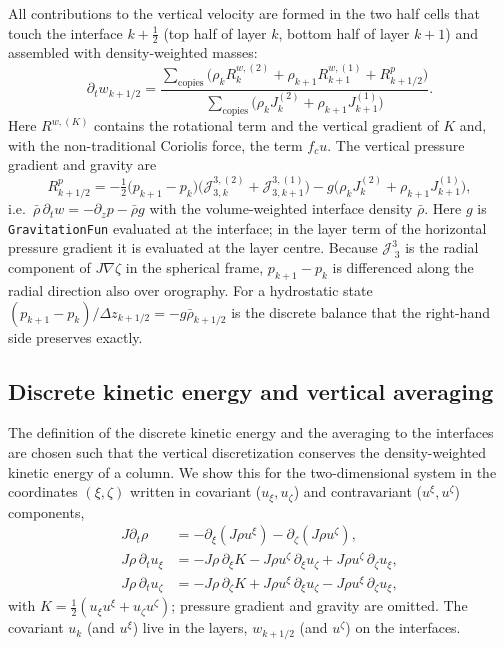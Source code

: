 \documentclass[11pt,a4paper]{article}
\newcommand{\Jm}{\mathcal{J}}
\newcommand{\code}[1]{\texttt{#1}}
\begin{document}
All contributions to the vertical velocity are formed in the two half cells
that touch the interface $k+\tfrac12$ (top half of layer $k$, bottom half of
layer $k+1$) and assembled with density-weighted masses:
\begin{equation}
  \partial_t w_{k+1/2} =
  \frac{\sum_{\text{copies}}\bigl(\rho_k R^{w,(2)}_k + \rho_{k+1} R^{w,(1)}_{k+1}
    + R^{p}_{k+1/2}\bigr)}
  {\sum_{\text{copies}}\bigl(\rho_k J^{(2)}_k + \rho_{k+1} J^{(1)}_{k+1}\bigr)}.
\end{equation}
Here $R^{w,(K)}$ contains the rotational term and the vertical gradient of
$K$ and, with the non-traditional Coriolis force, the term $f_cu$. The
vertical pressure gradient and gravity are
\begin{equation}
  R^p_{k+1/2} = -\tfrac12\bigl(p_{k+1} - p_k\bigr)
     \bigl(\Jm^{3,(2)}_{3,k} + \Jm^{3,(1)}_{3,k+1}\bigr)
     - g\bigl(\rho_k J^{(2)}_k + \rho_{k+1} J^{(1)}_{k+1}\bigr),
\end{equation}
i.e.\ $\bar\rho\,\partial_t w = -\partial_z p - \bar\rho g$ with the
volume-weighted interface density $\bar\rho$. Here $g$ is
\code{GravitationFun} evaluated at the interface; in the layer term of the
horizontal pressure gradient it is evaluated at the layer centre.
Because $\Jm^3_{\;3}$ is the radial component of $J\nabla\zeta$ in the
spherical frame, $p_{k+1}-p_k$ is differenced along the radial direction
also over orography. For a hydrostatic state
$(p_{k+1}-p_k)/\Delta z_{k+1/2} = -g\bar\rho_{k+1/2}$ is the discrete
balance that the right-hand side preserves exactly.

\subsection{Discrete kinetic energy and vertical averaging}
\label{sec:kin}

The definition of the discrete kinetic energy and the averaging to the
interfaces are chosen such that the vertical discretization conserves the
density-weighted kinetic energy of a column. We show this for the
two-dimensional system in the coordinates $(\xi,\zeta)$ written in covariant
($u_\xi,u_\zeta$) and contravariant ($u^\xi,u^\zeta$) components,
\begin{align}
  J\partial_t\rho &= -\partial_\xi(J\rho u^\xi) - \partial_\zeta(J\rho u^\zeta),\\
  J\rho\,\partial_t u_\xi &= -J\rho\,\partial_\xi K
     - J\rho u^\zeta\,\partial_\xi u_\zeta + J\rho u^\zeta\,\partial_\zeta u_\xi,\\
  J\rho\,\partial_t u_\zeta &= -J\rho\,\partial_\zeta K
     + J\rho u^\xi\,\partial_\xi u_\zeta - J\rho u^\xi\,\partial_\zeta u_\xi,
\end{align}
with $K = \tfrac12(u_\xi u^\xi + u_\zeta u^\zeta)$; pressure gradient and
gravity are omitted. The covariant $u_k$ (and $u^\xi$) live in the layers,
$w_{k+1/2}$ (and $u^\zeta$) on the interfaces.
\end{document}
